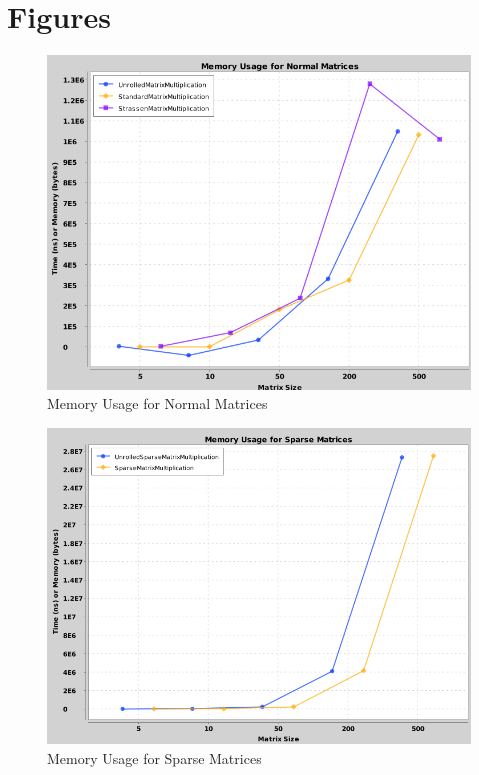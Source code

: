 \documentclass{article}
\begin{document}
\section*{Figures}
\begin{figure}[h]
    \centering
    \includegraphics[width=\textwidth]{mem_normal.png}
    \caption{Memory Usage for Normal Matrices}
\end{figure}

\begin{figure}[h]
    \centering
    \includegraphics[width=\textwidth]{mem_sparse.png}
    \caption{Memory Usage for Sparse Matrices}
\end{figure}
\end{document}
